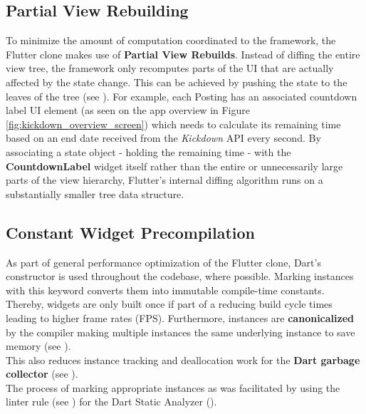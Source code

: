 \subsection{Partial View Rebuilding}
To minimize the amount of computation coordinated to the framework, the Flutter clone makes use of \textbf{Partial View Rebuilds}. 
Instead of diffing the entire view tree, the framework only recomputes parts of the UI that are actually affected by the state change. 
This can be achieved by pushing the state to the leaves of the tree (see \cite{StatefulWidgetPerformance2021}).
For example, each Posting has an associated countdown label UI element (as seen on the app overview in Figure \ref{fig:kickdown_overview_screen}) which needs to calculate its remaining time based on an end date received from the \textit{Kickdown} API every second.
By associating a state object - holding the remaining time - with the \textbf{CountdownLabel} widget itself rather than the entire or unnecessarily large parts of the view hierarchy, Flutter's internal diffing algorithm runs on a substantially smaller tree data structure.

\subsection{Constant Widget Precompilation} \label{section::constant_widget_precompilation}
As part of general performance optimization of the Flutter clone, Dart's  constructor is used throughout the codebase, where possible.
Marking instances with this keyword converts them into immutable compile-time constants.
Thereby,  widgets are only built once if part of a  reducing build cycle times leading to higher frame rates (FPS).
Furthermore, instances are \textbf{canonicalized} by the compiler making multiple instances the same underlying instance to save memory (see \cite{DartConstDocumentation}).\\
This also reduces instance tracking and deallocation work for the \textbf{Dart garbage collector} (see \cite{DartGarbageCollector2021}).\\
The process of marking appropriate instances as  was facilitated by using the  linter rule (see \cite{ConstLinterRule2021}) for the Dart Static Analyzer (\cite{DartCodeAnalysis2021}). 

